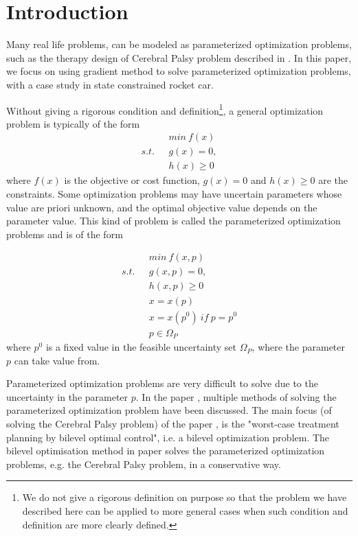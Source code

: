 

\chapter{Introduction}

Many real life problems, can be modeled as parameterized optimization problems, such as the therapy design of Cerebral Palsy problem described in \cite{MatSch22}. In this paper, we focus on using gradient method to solve parameterized optimization problems, with a case study in state constrained rocket car. 

Without giving a rigorous condition and definition\footnote{We do not give a rigorous definition on purpose so that the problem we have described here can be applied to more general cases when such condition and definition are more clearly defined.},  a general optimization problem is typically of the form
\begin{equation}
	\begin{aligned}
		 \  \  \ & min \  f(x) \\
		s.t.  \  \  \ & g(x) = 0, \\ 
		              &  h(x)  \geq  0 
	\end{aligned}
    \label{GeneralMin}
\end{equation}
where $f(x)$ is the objective or cost function, $g(x) = 0$ and $h(x)  \geq  0$ are the constraints. Some optimization problems may have uncertain parameters whose value are priori unknown, and the optimal objective value depends on the parameter value. This kind of problem is called the parameterized optimization problems and is of the form 


\begin{equation}
	\begin{aligned}
		\  \  \ & min \  f(x, p) \\
		s.t.  \  \  \ & g(x, p) = 0, \\ 
		&  h(x,p)  \geq  0  \\ 
		& x = x(p) \\
		& x = x(p^0) \  if \  p = p^0 \\
		& p \in \Omega_P		
	\end{aligned}
    \label{ParaMin}
\end{equation}
where $p^0$ is a fixed value in the feasible uncertainty set $\Omega_P$, where the parameter $p$ can take value from.

Parameterized optimization problems are very difficult to solve due to the uncertainty in the parameter $p$. In the paper \cite{MatSch22}, multiple methods of solving the parameterized optimization problem have been discussed. The main focus (of solving the Cerebral Palsy problem) of the paper \cite{MatSch22}, is the "worst-case treatment planning by bilevel optimal control", i.e. a bilevel optimization problem. The bilevel optimisation method in paper \cite{MatSch22} solves the parameterized optimization problems, e.g. the Cerebral Palsy problem, in a conservative way.


